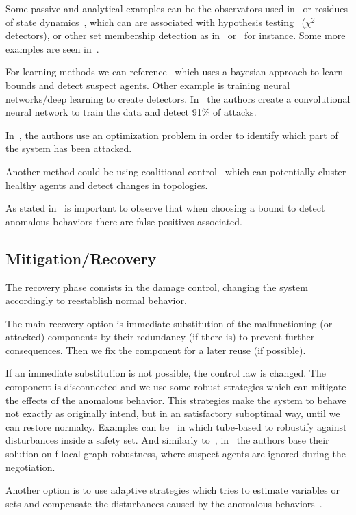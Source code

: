 \documentclass[../main.tex]{subfiles}
\begin{document}
Some passive and analytical examples can be the observators used in~\cite{HoehnZhang2016} or residues of state dynamics~\cite{TeixeiraEtAl2015,BoemEtAl2020}, which can are associated with hypothesis testing~\cite{MoSinopoli2009} ($\chi^{2}$ detectors), or other
set membership detection as in~\cite{FortiEtAl2016} or~\cite{MaestreEtAl2018} for instance.
Some more examples are seen in~\cite{PasqualettiEtAl2012,PasqualettiEtAl2013,ZhangEtAl2021a,ArauzEtAl2021}.

For learning methods we can reference~\cite{AnandutaEtAl2018,AnandutaEtAl2019,AnandutaEtAl2020} which uses
a bayesian approach to learn bounds and detect suspect agents.
Other example is training neural networks/deep learning to create detectors. In~\cite{HussainEtAl2021} the authors create a convolutional neural network to train the data and detect 91\% of \dDoS{} attacks.

In~\cite{BraunEtAl2020,BraunEtAl2020a}, the authors use an optimization problem in order to identify which part of the system has been attacked.

Another method could be using coalitional control~\cite{ChanfreutEtAl2021} which can potentially cluster healthy agents and detect changes in topologies.

\begin{remark}
As stated in~\cite{ArauzEtAl2021} is important to observe that when choosing a bound to detect anomalous behaviors there are false positives associated.
\end{remark}

\subsection{Mitigation/Recovery}
The recovery phase consists in the damage control, changing the system accordingly to reestablish normal behavior.

The main recovery option is immediate substitution of the malfunctioning (or attacked) components by their redundancy (if there is) to prevent further consequences.
Then we fix the component for a later reuse (if possible).

If an immediate substitution is not possible, the control law is changed.
The component is disconnected and we use some robust strategies which can mitigate the effects of the anomalous behavior.
This strategies make the system to behave not exactly as originally intend, but in an satisfactory suboptimal way, until we can restore normalcy.
Examples can be~\cite{MaestreEtAl2018} in which tube-based \mpc{} to robustify against disturbances inside a safety set.
And similarly to~\cite{VelardeEtAl2018}, in~\cite{AnandutaEtAl2018,AnandutaEtAl2019,AnandutaEtAl2020} the authors base their solution on f-local graph robustness, where suspect agents are ignored during the \dmpc{} negotiation.

Another option is to use adaptive strategies which tries to estimate variables or sets and compensate the disturbances caused by the anomalous behaviors~\cite{YangEtAl2022,LuEtAl2020}.
\end{document}
